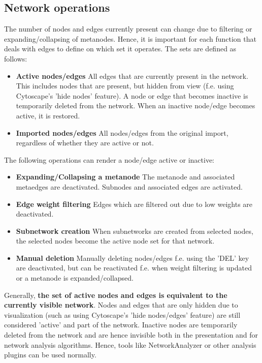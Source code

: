 \subsection{Network operations}
\label{sec:edge_op_def}

The number of nodes and edges currently present can change due to filtering or expanding/collapsing of metanodes. Hence, it is important for each function that deals with edges to define on which set it operates. The sets are defined as follows:

\begin{itemize}
\item \textbf{Active nodes/edges} All edges that are currently present in the network. This includes nodes that are present, but hidden from view (f.e. using Cytoscape's 'hide nodes' feature). A node or edge that becomes inactive is temporarily deleted from the network. When an inactive node/edge becomes active, it is restored.  
\item \textbf{Imported nodes/edges} All nodes/edges from the original import, regardless of whether they are active or not.
\end{itemize}

The following operations can render a node/edge active or inactive:
\begin{itemize}
\item \textbf{Expanding/Collapsing a metanode} The metanode and associated metaedges are deactivated. Subnodes and associated edges are activated.
\item \textbf{Edge weight filtering} Edges which are filtered out due to low weights are deactivated.
\item \textbf{Subnetwork creation} When subnetworks are created from selected nodes, the selected nodes become the active node set for that network.
\item \textbf{Manual deletion} Manually deleting nodes/edges f.e. using the 'DEL' key are deactivated, but can be reactivated f.e. when weight filtering is updated or a metanode is expanded/collapsed.
\end{itemize}

Generally, \textbf{the set of active nodes and edges is equivalent to the currently visible network}. Nodes and edges that are only hidden due to visualization (such as using Cytoscape's 'hide nodes/edges' feature) are still considered 'active' and part of the network. Inactive nodes are temporarily deleted from the network and are hence invisible both in the presentation and for network analysis algorithms. Hence, tools like NetworkAnalyzer or other analysis plugins can be used normally. 

